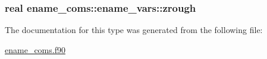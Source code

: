 \subsubsection[{\texorpdfstring{zrough}{zrough}}]{\setlength{\rightskip}{0pt plus 5cm}real ename\+\_\+coms\+::ename\+\_\+vars\+::zrough}\hypertarget{structename__coms_1_1ename__vars_a3d58740a12137c047498e7ea2e9482d7}{}\label{structename__coms_1_1ename__vars_a3d58740a12137c047498e7ea2e9482d7}


The documentation for this type was generated from the following file\+:\begin{DoxyCompactItemize}
\item 
\hyperlink{ename__coms_8f90}{ename\+\_\+coms.\+f90}\end{DoxyCompactItemize}
